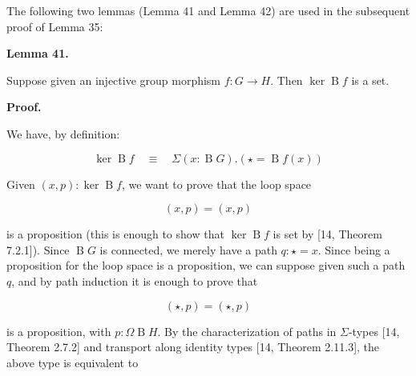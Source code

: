 \documentclass[10pt,a4paper]{article}
\begin{document}
 
 
The following two lemmas (Lemma 41 and Lemma 42) are used in the subsequent proof of Lemma 35:\par
 
 
 
\par\medskip\noindent\textbf{Lemma 41.}\par
 
 
Suppose given an injective group morphism $f:G\to H$. Then $\ker\operatorname{B}f$ is a set.\par
 
 
 
 
 
\par\medskip\noindent\textbf{Proof.}\par
 
 
We have, by definition:\par
  
\par  \quad  \[\ker\operatorname{B}f\quad\equiv\quad\Sigma(x:\operatorname{B}G).(\star=\operatorname{B}f(x))\]\quad  \quad  
  
Given $(x,p):\ker\operatorname{B}f$, we want to prove that the loop space\par
  
\par  \quad  \[(x,p)=(x,p)\]\quad  \quad  
  
is a proposition (this is enough to show that $\ker\operatorname{B}f$ is set by [14, Theorem 7.2.1]). Since $\operatorname{B}G$ is connected, we merely have a path $q:\star=x$. Since being a proposition for the loop space is a proposition, we can suppose given such a path $q$, and by path induction it is enough to prove that\par
  
\par  \quad  \[(\star,p)=(\star,p)\]\quad  \quad  
  
is a proposition, with $p:\Omega\operatorname{B}H$. By the characterization of paths in $\Sigma$-types [14, Theorem 2.7.2] and transport along identity types [14, Theorem 2.11.3], the above type is equivalent to\par
  
\end{document}
